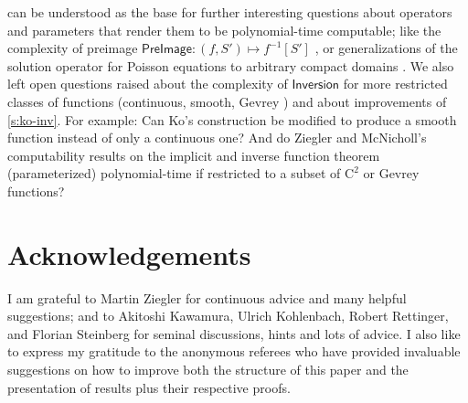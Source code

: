 \documentclass{CSML}
\newcommand{\dsoinv}{\mathsf{Inversion}}
\newcommand{\cfn}{\mathrm{C}}
\begin{document}
 can be understood as the base for further
interesting questions about operators and parameters that render them to be
polynomial-time computable; like the complexity of preimage
$\mathsf{PreImage} \colon (f,S') \mapsto f^{-1}[S']$
\cite[Lem.~24]{ziegler2004linalg}, or generalizations of the solution operator
for Poisson equations to arbitrary compact domains \cite{KSZ13}.
We also left open questions raised about the complexity of $\dsoinv$ for more
restricted classes of functions (continuous, smooth, Gevrey
\cite{LLM:Gevrey,KMRZarXiv}) and about improvements of \cref{s:ko-inv}.
For example:
Can Ko's construction be modified to produce a smooth function instead of
only a continuous one?
And do Ziegler and McNicholl's computability results on the implicit and
inverse function theorem \cite{Ziegler06,McNicholl08} (parameterized)
polynomial-time if restricted to a subset of $\cfn^2$ or Gevrey functions?


\section*{Acknowledgements}


I am grateful to Martin Ziegler for continuous advice and many helpful
suggestions; and to Akitoshi Kawamura, Ulrich Kohlenbach, Robert Rettinger,
and Florian Steinberg for seminal discussions, hints and lots of advice.
I also like to express my gratitude to the anonymous referees who have provided
invaluable suggestions on how to improve both the structure of this paper and
the presentation of results plus their respective proofs.
\end{document}
